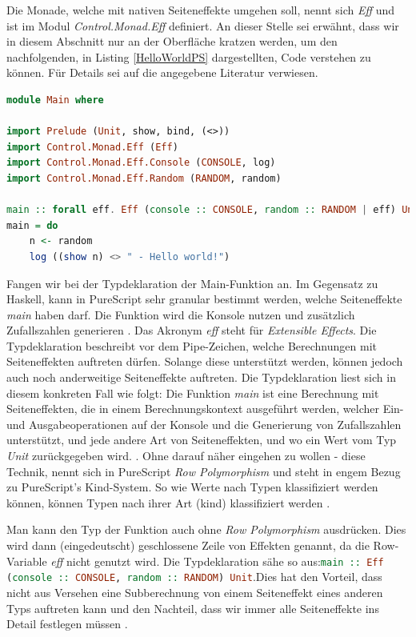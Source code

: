 \documentclass[
12pt,
ngerman,
oneside]
{scrbook} %
\begin{document}
Die Monade, welche mit nativen Seiteneffekte umgehen soll, nennt sich \emph{Eff} und ist im Modul \emph{Control.Monad.Eff} definiert. An dieser Stelle sei erwähnt, dass wir in diesem Abschnitt nur an der Oberfläche kratzen werden, um den nachfolgenden, in Listing \ref{HelloWorldPS} dargestellten, Code verstehen zu können. Für Details sei auf die angegebene Literatur verwiesen.

\begin{lstlisting}[language=purescript, style=numbered-and-boxed, caption=Hello World Beispiel, label=HelloWorldPS]
module Main where

import Prelude (Unit, show, bind, (<>))
import Control.Monad.Eff (Eff)
import Control.Monad.Eff.Console (CONSOLE, log)
import Control.Monad.Eff.Random (RANDOM, random) 

main :: forall eff. Eff (console :: CONSOLE, random :: RANDOM | eff) Unit
main = do
	n <- random
	log ((show n) <> " - Hello world!")
\end{lstlisting}

Fangen wir bei der Typdeklaration der Main-Funktion an. Im Gegensatz zu Haskell, kann in PureScript sehr granular bestimmt werden, welche Seiteneffekte \emph{main} haben darf. Die Funktion wird die Konsole nutzen und zusätzlich Zufallszahlen generieren \cite[][S. 108--109]{Freeman17}. Das Akronym \emph{eff} steht für \emph{Extensible Effects}. Die Typdeklaration beschreibt vor dem Pipe-Zeichen, welche Berechnungen mit Seiteneffekten auftreten dürfen. Solange diese unterstützt werden, können jedoch auch noch anderweitige Seiteneffekte auftreten. Die Typdeklaration liest sich in diesem konkreten Fall wie folgt: \glqq Die Funktion \emph{main} ist eine Berechnung mit Seiteneffekten, die in einem Berechnungskontext ausgeführt werden, welcher Ein- und Ausgabeoperationen auf der Konsole und die Generierung von Zufallszahlen unterstützt, und jede andere Art von Seiteneffekten, und wo ein Wert vom Typ \emph{Unit} zurückgegeben wird.\grqq{} \cite[][S. 109--110]{Freeman17}. Ohne darauf näher eingehen zu wollen - diese Technik, nennt sich in PureScript \emph{Row Polymorphism} und steht in engem Bezug zu PureScript's Kind-System. So wie Werte nach Typen klassifiziert werden können, können Typen nach ihrer Art (kind) klassifiziert werden \cite[][S. 110--112]{Freeman17}.

Man kann den Typ der Funktion auch ohne \emph{Row Polymorphism} ausdrücken. Dies wird dann (eingedeutscht) geschlossene Zeile von Effekten genannt, da die Row-Variable \emph{eff} nicht genutzt wird. Die Typdeklaration sähe so aus:\newline \lstinline[language=purescript, columns=fixed]{main :: Eff (console :: CONSOLE, random :: RANDOM) Unit}.\newline Dies hat den Vorteil, dass nicht aus Versehen eine Subberechnung von einem Seiteneffekt eines anderen Typs auftreten kann und den Nachteil, dass wir immer alle Seiteneffekte ins Detail festlegen müssen \cite[][S. 112]{Freeman17}. 
\end{document}
